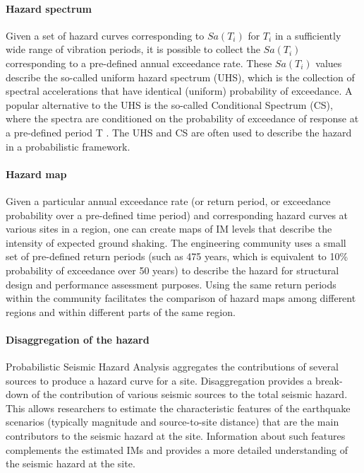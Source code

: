 \paragraph{Hazard spectrum} Given a set of hazard curves corresponding to $Sa(T_i)$ for $T_i$ in a sufficiently wide range of vibration periods, it is possible to collect the $Sa(T_i)$ corresponding to a pre-defined annual exceedance rate. These $Sa(T_i)$ values describe the so-called uniform hazard spectrum (UHS), which is the collection of spectral accelerations that have identical (uniform) probability of exceedance. A popular alternative to the UHS is the so-called Conditional Spectrum (CS), where the spectra are conditioned on the probability of exceedance of response at a pre-defined period T \citep{lin2013conditional, baker2018improved}. The UHS and CS are often used to describe the hazard in a probabilistic framework.

\paragraph{Hazard map} Given a particular annual exceedance rate (or return period, or exceedance probability over a pre-defined time period) and corresponding hazard curves at various sites in a region, one can create maps of IM levels that describe the intensity of expected ground shaking. The engineering community uses a small set of pre-defined return periods (such as 475 years, which is equivalent to 10\% probability of exceedance over 50 years) to describe the hazard for structural design and performance assessment purposes. Using the same return periods within the community facilitates the comparison of hazard maps among different regions and within different parts of the same region.

\paragraph{Disaggregation of the hazard} Probabilistic Seismic Hazard Analysis aggregates the contributions of several sources to produce a hazard curve for a site. Disaggregation provides a break-down of the contribution of various seismic sources to the total seismic hazard. This allows researchers to estimate the characteristic features of the earthquake scenarios (typically magnitude and source-to-site distance) that are the main contributors to the seismic hazard at the site. Information about such features complements the estimated IMs and provides a more detailed understanding of the seismic hazard at the site.

